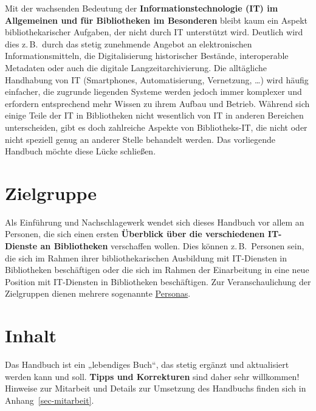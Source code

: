 \documentclass[
  11pt,
  letterpaper,
  DIV=11,
  twoside]{scrreprt}
\begin{document}
Mit der wachsenden Bedeutung der \textbf{Informationstechnologie (IT) im
Allgemeinen und für Bibliotheken im Besonderen} bleibt kaum ein Aspekt
bibliothekarischer Aufgaben, der nicht durch IT unterstützt wird.
Deutlich wird dies z.\,B.~durch das stetig zunehmende Angebot an
elektronischen Informationsmitteln, die Digitalisierung historischer
Bestände, interoperable Metadaten oder auch die digitale
Langzeitarchivierung. Die alltägliche Handhabung von IT (Smartphones,
Automatisierung, Vernetzung, \ldots) wird häufig einfacher, die zugrunde
liegenden Systeme werden jedoch immer komplexer und erfordern
entsprechend mehr Wissen zu ihrem Aufbau und Betrieb. Während sich
einige Teile der IT in Bibliotheken nicht wesentlich von IT in anderen
Bereichen unterscheiden, gibt es doch zahlreiche Aspekte von
Bibliotheks-IT, die nicht oder nicht speziell genug an anderer Stelle
behandelt werden. Das vorliegende Handbuch möchte diese Lücke schließen.

\section{Zielgruppe}\label{zielgruppe}

Als Einführung und Nachschlagewerk wendet sich dieses Handbuch vor allem
an Personen, die sich einen ersten \textbf{Überblick über die
verschiedenen IT-Dienste an Bibliotheken} verschaffen wollen. Dies
können z.\,B.~Personen sein, die sich im Rahmen ihrer bibliothekarischen
Ausbildung mit IT-Diensten in Bibliotheken beschäftigen oder die sich im
Rahmen der Einarbeitung in eine neue Position mit IT-Diensten in
Bibliotheken beschäftigen. Zur Veranschaulichung der Zielgruppen dienen
mehrere sogenannte \hyperref[personas]{Personas}.

\section{Inhalt}\label{inhalt}

\begin{tcolorbox}[enhanced jigsaw, leftrule=.75mm, toprule=.15mm, left=2mm, opacityback=0, arc=.35mm, colback=white, breakable, colframe=quarto-callout-tip-color-frame, rightrule=.15mm, bottomrule=.15mm]
\begin{minipage}[t]{5.5mm}
\textcolor{quarto-callout-tip-color}{\faLightbulb}
\end{minipage}%
\begin{minipage}[t]{\textwidth - 5.5mm}

Das Handbuch ist ein „lebendiges Buch``, das stetig ergänzt und
aktualisiert werden kann und soll. \textbf{Tipps und Korrekturen} sind
daher sehr willkommen! Hinweise zur Mitarbeit und Details zur Umsetzung
des Handbuchs finden sich in Anhang~\ref{sec-mitarbeit}.

\end{minipage}%
\end{tcolorbox}
\end{document}
